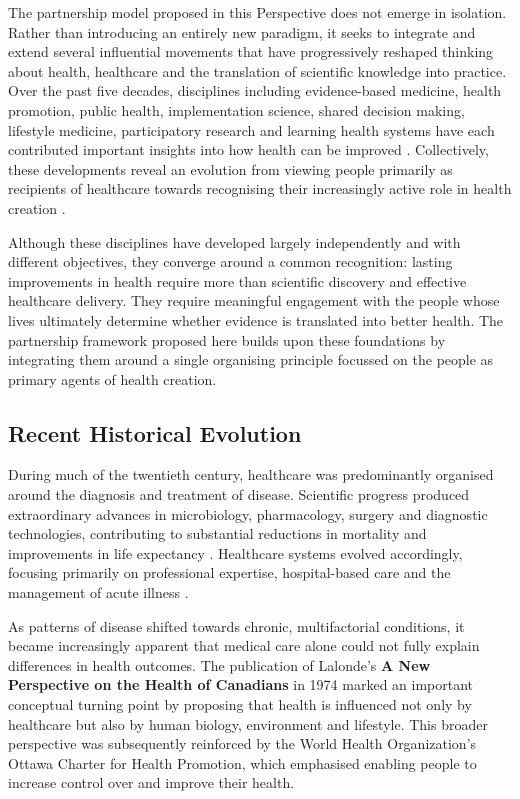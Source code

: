 \documentclass{article}
\begin{document}
The partnership model proposed in this Perspective does not emerge in isolation. Rather than introducing an entirely new paradigm, it seeks to integrate and extend several influential movements that have progressively reshaped thinking about health, healthcare and the translation of scientific knowledge into practice. Over the past five decades, disciplines including evidence-based medicine, health promotion, public health, implementation science, shared decision making, lifestyle medicine, participatory research \cite{Israel1998} and learning health systems have each contributed important insights into how health can be improved \cite{Sackett1996} \cite{WHO1986} \cite{Eccles2006} \cite{Elwyn2012} \cite{IOM2013} \cite{Katz2009}. Collectively, these developments reveal an evolution from viewing people primarily as recipients of healthcare towards recognising their increasingly active role in health creation \cite{WHOIPCHS2016}.

Although these disciplines have developed largely independently and with different objectives, they converge around a common recognition: lasting improvements in health require more than scientific discovery and effective healthcare delivery. They require meaningful engagement \cite{WHOIPCHS2016} with the people whose lives ultimately determine whether evidence is translated into better health. The partnership framework proposed here builds upon these foundations by integrating them around a single organising principle focussed on the people as primary agents of health creation.
\subsection{Recent Historical Evolution}
\label{sec:org71c77f5}

During much of the twentieth century, healthcare was predominantly organised around the diagnosis and treatment of disease. Scientific progress produced extraordinary advances in microbiology, pharmacology, surgery and diagnostic technologies, contributing to substantial reductions in mortality and improvements in life expectancy \cite{WHO2025}. Healthcare systems evolved accordingly, focusing primarily on professional expertise, hospital-based care and the management of acute illness \cite{IOM2001}.

As patterns of disease shifted towards chronic, multifactorial conditions, it became increasingly apparent that medical care alone could not fully explain differences in health outcomes. The publication of Lalonde's \textbf{A New Perspective on the Health of Canadians} \cite{Lalonde1974} in 1974 marked an important conceptual turning point by proposing that health is influenced not only by healthcare but also by human biology, environment and lifestyle. This broader perspective was subsequently reinforced by the World Health Organization's Ottawa Charter \cite{WHO1986} for Health Promotion, which emphasised enabling people to increase control over and improve their health.
\end{document}
